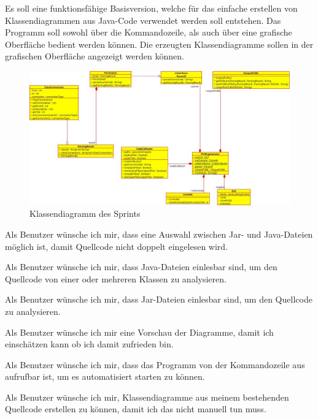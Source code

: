 Es soll eine funktionsfähige Basisversion, welche für das einfache erstellen von Klassendiagrammen aus Java-Code verwendet werden soll entstehen. Das Programm soll sowohl über die Kommandozeile, als auch über eine grafische Oberfläche bedient werden können. Die erzeugten Klassendiagramme sollen in der grafischen Oberfläche angezeigt werden können.

\begin{figure}[hbtp]
\centering
\includegraphics[scale=0.5]{Bilder/classDiagrammSprint1}
\caption{Klassendiagramm des Sprints}
\end{figure}
\nsecend

Als Benutzer wünsche ich mir, dass eine Auswahl zwischen Jar- und Java-Dateien möglich ist, damit Quellcode nicht doppelt eingelesen wird.
\nsecend

Als Benutzer wünsche ich mir, dass Java-Dateien einlesbar sind, um den Quellcode von einer oder mehreren Klassen zu analysieren.
\nsecend

Als Benutzer wünsche ich mir, dass Jar-Dateien einlesbar sind, um den Quellcode zu analysieren.
\nsecend
\nsecend

Als Benutzer wünsche ich mir eine Vorschau der Diagramme, damit ich einschätzen kann ob ich damit zufrieden bin.
\nsecend

Als Benutzer wünsche ich mir, dass das Programm von der Kommandozeile aus aufrufbar ist, um es automatisiert starten zu können.
\nsecend

Als Benutzer wünsche ich mir, Klassendiagramme aus meinem bestehenden Quellcode erstellen zu können, damit ich das nicht manuell tun muss.
\nsecend

